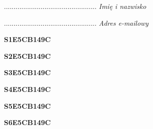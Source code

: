 \begin{turn}{90}\begin{minipage}{\linewidth} \vspace{20mm} ................................................  \textit{Imię i nazwisko}\end{minipage}\end{turn}

\begin{turn}{90}\begin{minipage}{\linewidth} \vspace{20mm} ................................................  \textit{Adres e-mailowy}\end{minipage}\end{turn}

\begin{turn}{90}\huge \begin{minipage}{\linewidth} \vspace{10mm}\textbf{S1E5CB149C}\end{minipage}\end{turn}

\begin{turn}{90}\huge \begin{minipage}{\linewidth} \vspace{10mm}\textbf{S2E5CB149C}\end{minipage}\end{turn}

\begin{turn}{90}\huge \begin{minipage}{\linewidth} \vspace{10mm}\textbf{S3E5CB149C}\end{minipage}\end{turn}

\begin{turn}{90}\huge \begin{minipage}{\linewidth} \vspace{10mm}\textbf{S4E5CB149C}\end{minipage}\end{turn}

\begin{turn}{90}\huge \begin{minipage}{\linewidth} \vspace{10mm}\textbf{S5E5CB149C}\end{minipage}\end{turn}

\begin{turn}{90}\huge \begin{minipage}{\linewidth} \vspace{10mm}\textbf{S6E5CB149C}\end{minipage}\end{turn}